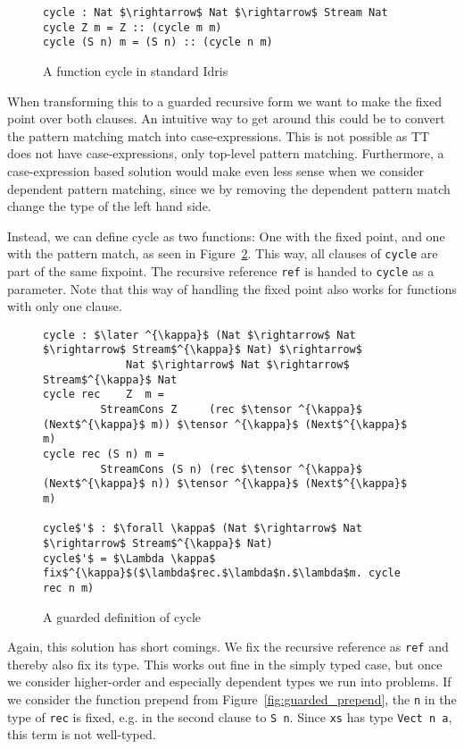 \begin{figure}[h]
  \begin{lstlisting}[mathescape]
cycle : Nat $\rightarrow$ Nat $\rightarrow$ Stream Nat
cycle Z m = Z :: (cycle m m)
cycle (S n) m = (S n) :: (cycle n m)
\end{lstlisting}
  \caption{A function cycle in standard Idris}
  \label{fig:cycle_non_guarded}
\end{figure}

When transforming this to a guarded recursive form we want to make the fixed
point over both clauses. An intuitive way to get around this could be to
convert the pattern matching match into case-expressions. This is not possible
as TT does not have case-expressions, only top-level pattern
matching. Furthermore, a case-expression based solution would make even less
sense when we consider dependent pattern matching, since we by removing the
dependent pattern match change the type of the left hand side.

Instead, we can define cycle as two functions: One with the fixed point, and one
with the pattern match, as seen in Figure~\ref{fig:cycle_guarded}. This way, all
clauses of \texttt{cycle} are part of the same fixpoint. The recursive reference
\texttt{ref} is handed to \texttt{cycle} as a parameter. Note that this way of
handling the fixed point also works for functions with only one clause.

\begin{figure}[h]
\begin{lstlisting}[mathescape]
cycle : $\later ^{\kappa}$ (Nat $\rightarrow$ Nat $\rightarrow$ Stream$^{\kappa}$ Nat) $\rightarrow$ 
             Nat $\rightarrow$ Nat $\rightarrow$ Stream$^{\kappa}$ Nat
cycle rec    Z  m = 
         StreamCons Z     (rec $\tensor ^{\kappa}$ (Next$^{\kappa}$ m)) $\tensor ^{\kappa}$ (Next$^{\kappa}$ m)
cycle rec (S n) m = 
         StreamCons (S n) (rec $\tensor ^{\kappa}$ (Next$^{\kappa}$ n)) $\tensor ^{\kappa}$ (Next$^{\kappa}$ m)

cycle$'$ : $\forall \kappa$ (Nat $\rightarrow$ Nat $\rightarrow$ Stream$^{\kappa}$ Nat)
cycle$'$ = $\Lambda \kappa$ fix$^{\kappa}$($\lambda$rec.$\lambda$n.$\lambda$m. cycle rec n m)
\end{lstlisting}
  \caption{A guarded definition of cycle}
  \label{fig:cycle_guarded}
\end{figure}

Again, this solution has short comings. We fix the recursive
reference as \texttt{ref} and thereby also fix its type. This works out fine in
the simply typed case, but once we consider higher-order and especially
dependent types we run into problems. If we consider the function prepend from
Figure~\ref{fig:guarded_prepend}, the \texttt{n} in the type of \texttt{rec} is
fixed, e.g. in the second clause to \texttt{S n}. Since \texttt{xs} has type
\texttt{Vect n a}, this term is not well-typed.

